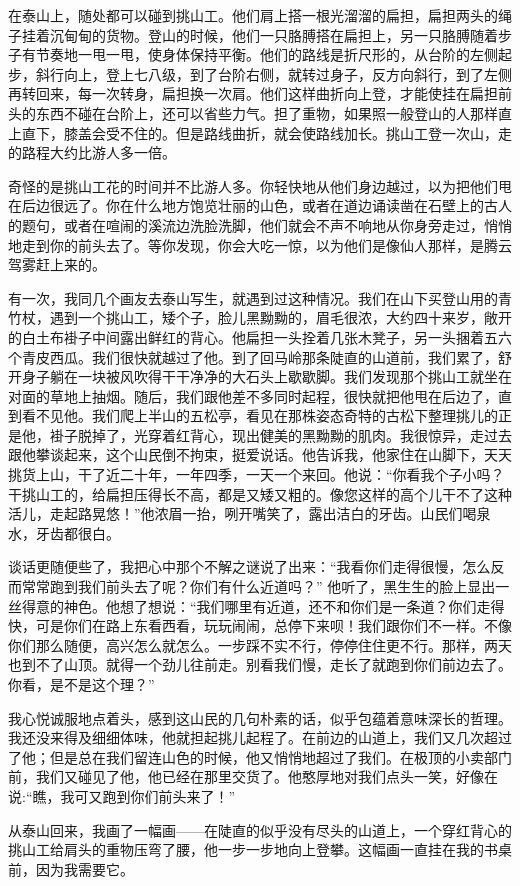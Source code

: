 \documentclass[12pt,UTF-8,openany]{ctexbook}
\begin{document}
\begin{large}
    
    在泰山上，随处都可以碰到挑山工。他们肩上搭一根光溜溜的扁担，扁担两头的绳子挂着沉甸甸的货物。登山的时候，他们一只胳膊搭在扁担上，另一只胳膊随着步子有节奏地一甩一甩，使身体保持平衡。他们的路线是折尺形的，从台阶的左侧起步，斜行向上，登上七八级，到了台阶右侧，就转过身子，反方向斜行，到了左侧再转回来，每一次转身，扁担换一次肩。他们这样曲折向上登，才能使挂在扁担前头的东西不碰在台阶上，还可以省些力气。担了重物，如果照一般登山的人那样直上直下，膝盖会受不住的。但是路线曲折，就会使路线加长。挑山工登一次山，走的路程大约比游人多一倍。
    
    奇怪的是挑山工花的时间并不比游人多。你轻快地从他们身边越过，以为把他们甩在后边很远了。你在什么地方饱览壮丽的山色，或者在道边诵读凿在石壁上的古人的题句，或者在喧闹的溪流边洗脸洗脚，他们就会不声不响地从你身旁走过，悄悄地走到你的前头去了。等你发现，你会大吃一惊，以为他们是像仙人那样，是腾云驾雾赶上来的。
    
    有一次，我同几个画友去泰山写生，就遇到过这种情况。我们在山下买登山用的青竹杖，遇到一个挑山工，矮个子，脸儿黑黝黝的，眉毛很浓，大约四十来岁，敞开的白土布褂子中间露出鲜红的背心。他扁担一头拴着几张木凳子，另一头捆着五六个青皮西瓜。我们很快就越过了他。到了回马岭那条陡直的山道前，我们累了，舒开身子躺在一块被风吹得干干净净的大石头上歇歇脚。我们发现那个挑山工就坐在对面的草地上抽烟。随后，我们跟他差不多同时起程，很快就把他甩在后边了，直到看不见他。我们爬上半山的五松亭，看见在那株姿态奇特的古松下整理挑儿的正是他，褂子脱掉了，光穿着红背心，现出健美的黑黝黝的肌肉。我很惊异，走过去跟他攀谈起来，这个山民倒不拘束，挺爱说话。他告诉我，他家住在山脚下，天天挑货上山，干了近二十年，一年四季，一天一个来回。他说：“你看我个子小吗？干挑山工的，给扁担压得长不高，都是又矮又粗的。像您这样的高个儿干不了这种活儿，走起路晃悠！”他浓眉一抬，咧开嘴笑了，露出洁白的牙齿。山民们喝泉水，牙齿都很白。
    
    谈话更随便些了，我把心中那个不解之谜说了出来：“我看你们走得很慢，怎么反而常常跑到我们前头去了呢？你们有什么近道吗？” 他听了，黑生生的脸上显出一丝得意的神色。他想了想说：“我们哪里有近道，还不和你们是一条道？你们走得快，可是你们在路上东看西看，玩玩闹闹，总停下来呗！我们跟你们不一样。不像你们那么随便，高兴怎么就怎么。一步踩不实不行，停停住住更不行。那样，两天也到不了山顶。就得一个劲儿往前走。别看我们慢，走长了就跑到你们前边去了。你看，是不是这个理？”
    
    我心悦诚服地点着头，感到这山民的几句朴素的话，似乎包蕴着意味深长的哲理。我还没来得及细细体味，他就担起挑儿起程了。在前边的山道上，我们又几次超过了他；但是总在我们留连山色的时候，他又悄悄地超过了我们。在极顶的小卖部门前，我们又碰见了他，他已经在那里交货了。他憨厚地对我们点头一笑，好像在说:“瞧，我可又跑到你们前头来了！”
    
    从泰山回来，我画了一幅画——在陡直的似乎没有尽头的山道上，一个穿红背心的挑山工给肩头的重物压弯了腰，他一步一步地向上登攀。这幅画一直挂在我的书桌前，因为我需要它。
    
\end{large}
\end{document}
